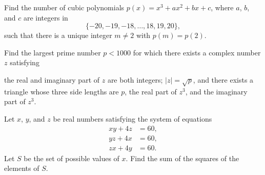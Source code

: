 \begin{question}[name={2023 AIME I, \href{https://artofproblemsolving.com/community/c4p27048835}{Problem 9}}]
	Find the number of cubic polynomials $p(x) = x^3 + ax^2 + bx + c$, where $a$, $b$, and $c$ are integers in $$\{-20, -19,-18, \dots , 18, 19, 20\},$$ such that there is a unique integer $m \neq 2$ with $p(m) = p(2)$.
\end{question}


%	









\begin{question}[name={2023 AIME I, \href{https://artofproblemsolving.com/community/c4p27048771}{Problem 15}}]
	Find the largest prime number $p<1000$ for which there exists a complex number $z$ satisfying
	\begin{tasks}
		\task the real and imaginary part of $z$ are both integers;
		\task $|z|=\sqrt{p}$, and
		\task there exists a triangle whose three side lengths are $p$, the real part of $z^{3}$, and the imaginary part of $z^{3}$.
	\end{tasks}
\end{question}





%	









\begin{question}[name={2023 AIME II, \href{https://artofproblemsolving.com/community/c4p27101498}{Problem 2}}]
	Let $x$, $y$, and $z$ be real numbers satisfying the system of equations
	\begin{align*}
		xy+4z&=60,\\
		yz+4x&=60,\\
		zx+4y&=60.
	\end{align*}Let $S$ be the set of possible values of $x$. Find the sum of the squares of the elements of $S$.
\end{question}





